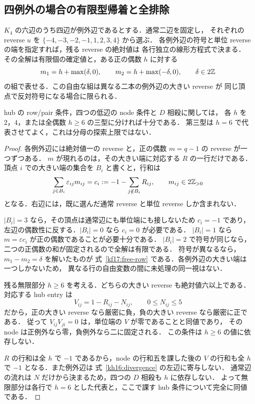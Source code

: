 \subsection{四例外の場合の有限型帰着と全排除}
\label{kf17:section}

\begin{lemma}
\label{kf17:finite-row-types}
$K_4$ の六辺のうち四辺が例外辺であるとする．通常二辺を固定し，
それぞれの reverse $u$ を $\{-4,-3,-2,-1,1,2,3,4\}$ から選ぶ．
各例外辺の符号と単位 reverse の端を指定すれば，残る reverse の絶対値は
各行独立の線形方程式で決まる．
その全解は有限個の確定値と，ある正の偶数 $h$ に対する
\begin{equation}\label{kf17:free-row}
 m_1=h+\max(\delta,0),\qquad
 m_2=h+\max(-\delta,0),\qquad \delta\in2\mathbb Z
\end{equation}
の組で表せる．この自由な組は異なる二本の例外辺の大きい reverse が
同じ頂点で反対符号になる場合に限られる．

hub の row/pair 条件，四つの低辺の node 条件と $D$ 相殺に関しては，
各 $h$ を $2$，$4$，または全偶数 $h\ge6$ の三型に分ければ十分である．
第三型は $h=6$ で代表させてよく，これは分母の探索上限ではない．
\end{lemma}

\begin{proof}
各例外辺には絶対値一の reverse と，正の偶数 $m=q-1$ の reverse が一つずつある．
$m$ が現れるのは，その大きい端に対応する $R$ の一行だけである．
頂点 $i$ での大きい端の集合を $B_i$ と書くと，行和は
\begin{equation}\label{kf17:row-equation}
 \sum_{j\in B_i}\varepsilon_{ij}m_{ij}
 =c_i:=-1-\sum_{j\notin B_i}R_{ij},
 \qquad m_{ij}\in2\mathbb Z_{>0}
\end{equation}
となる．右辺には，既に選んだ通常 reverse と単位 reverse しか含まれない．

$|B_i|=3$ なら，その頂点は通常辺にも単位端にも接しないため $c_i=-1$ であり，
左辺の偶数性に反する．$|B_i|=0$ なら $c_i=0$ が必要である．
$|B_i|=1$ なら $m=\varepsilon c_i$ が正の偶数であることが必要十分である．
$|B_i|=2$ で符号が同じなら，二つの正偶数の和が固定されるので全解は有限である．
符号が異なるなら，$m_1-m_2=\delta$ を解いたものが
式~\eqref{kf17:free-row} である．各例外辺の大きい端は一つしかないため，
異なる行の自由変数の間に未処理の同一視はない．

残る無限部分 $h\ge6$ を考える．どちらの大きい reverse も絶対値六以上である．
対応する hub entry は
\[
 V_{ij}=1-R_{ij}-N_{ij},\qquad0\le N_{ij}\le5
\]
だから，正の大きい reverse なら厳密に負，負の大きい reverse なら厳密に正である．
従って $V_{ij}V_{ji}=0$ は，単位端の $V$ が零であることと同値であり，
その node は正例外なら零，負例外なら二に固定される．
この条件は $h\ge6$ の値に依存しない．

$R$ の行和は全 $h$ で $-1$ であるから，node の行和五を課した後の
$V$ の行和も全 $h$ で $-1$ となる．また例外辺は
式~\eqref{kh16:divergence} の左辺に寄与しない．
通常辺の流れは $N$ だけから決まるため，四つの $D$ 相殺も $h$ に依存しない．
よって無限部分は各行で $h=6$ とした代表と，ここで課す hub 条件について完全に同値である．
\end{proof}

